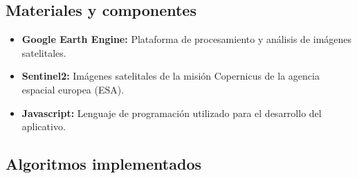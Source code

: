   \subsection{Materiales y componentes}

    \begin{itemize}
      \item \textbf{Google Earth Engine:} Plataforma de procesamiento y análisis de imágenes satelitales.
      \item \textbf{Sentinel2:} Imágenes satelitales de la misión Copernicus de la agencia espacial europea (ESA).
      \item \textbf{Javascript:} Lenguaje de programación utilizado para el desarrollo del aplicativo. 
    \end{itemize}

  \subsection{Algoritmos implementados}
  
